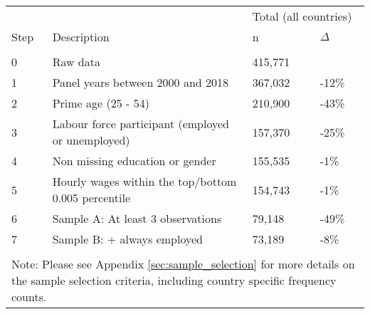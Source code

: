 \begin{tabular}{llll}
   \toprule 
 
&  & 
\multicolumn{2}{l}{Total (all countries)}
\\  
 
 
\multicolumn{1}{l}{Step} & 
\multicolumn{1}{l}{Description} 
& n & $\Delta$
\\ 
\cmidrule(lr){1-2}
\cmidrule(lr){3-4}
\\[-1.8ex]  
 
0 & Raw data & 415,771 &  \\ 
  1 & Panel years between 2000 and 2018 & 367,032 & -12\% \\ 
  2 & Prime age (25 - 54) & 210,900 & -43\% \\ 
  3 & Labour force participant (employed or unemployed) & 157,370 & -25\% \\ 
  4 & Non missing education or gender & 155,535 & -1\% \\ 
  5 & Hourly wages within the top/bottom 0.005 percentile & 154,743 & -1\% \\ 
  6 & Sample A: At least 3 observations & 79,148 & -49\% \\ 
  7 & Sample B: + always employed & 73,189 & -8\% \\ 
   \bottomrule \\[-1.8ex] 

               \multicolumn{4}{p{5.75in}}{Note: Please see Appendix \ref{sec:sample_selection} for more details on the sample selection criteria, including country specific frequency counts.} 
\end{tabular}
